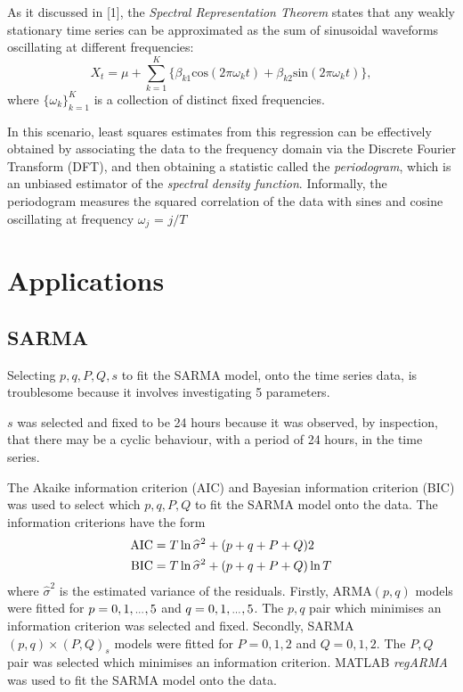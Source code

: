 \documentclass[]{article}
\newcommand{\dotdotdot}{\vphantom{.}_{\cdots}}
\begin{document}
As it discussed in [1], the \textit{Spectral Representation Theorem} states that any weakly stationary time series can be approximated as the
sum of sinusoidal waveforms oscillating at different frequencies:
\begin{equation}
X_{t} = \mu + \sum_{k = 1}^{K} \big\{ \beta_{k 1}\text{cos}(2\pi\omega_k t) + \beta_{k 2}\text{sin}(2\pi\omega_k t) \big\},
\end{equation}
where $\{\omega_k\}_{k = 1}^{K}$ is a collection of distinct fixed frequencies.
\vspace{0.1cm}

In this scenario, least squares estimates from this regression can be effectively obtained by associating the data to the frequency domain via the Discrete Fourier Transform (DFT), and then obtaining a statistic called the \textit{periodogram}, which is an unbiased estimator of the \textit{spectral density function}. Informally, the periodogram 
measures the squared correlation of the data with sines and cosine oscillating at frequency $\omega_j$ = $j/T$

\section{Applications}
\subsection{SARMA}
Selecting $p,q,P,Q,s$ to fit the SARMA model, onto the time series data, is troublesome because it involves investigating 5 parameters.

$s$ was selected and fixed to be 24 hours because it was observed, by inspection, that there may be a cyclic behaviour, with a period of 24 hours, in the time series.

The Akaike information criterion (AIC) and Bayesian information criterion (BIC) was used to select which $p,q,P,Q$ to fit the SARMA model onto the data. The information criterions have the form
\begin{align}
\textup{AIC}&=T\ln{\widehat{\sigma}^2}+(p+q+P+Q)2\\
\textup{BIC}&=T\ln{\widehat{\sigma}^2}+(p+q+P+Q)\ln{T}
\end{align}
where $\widehat{\sigma}^2$ is the estimated variance of the residuals. Firstly, ARMA$(p,q)$ models were fitted for $p=0,1,\dotdotdot,5$ and $q=0,1,\dotdotdot,5$. The $p,q$ pair which minimises an information criterion was selected and fixed. Secondly, SARMA$(p,q)\times(P,Q)_s$ models were fitted for $P=0,1,2$ and $Q=0,1,2$. The $P,Q$ pair was selected which minimises an information criterion. MATLAB \emph{regARMA} was used to fit the SARMA model onto the data.
\end{document}
